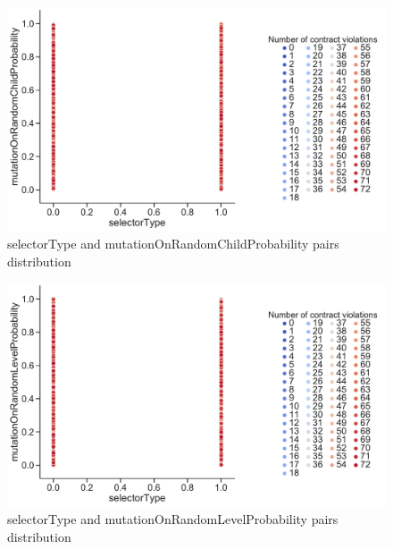 \begin{figure}
	\centering
	\includegraphics[width=\textwidth]{images/PairsDistr/selectorType_mutationOnRandomChildProbability.pdf}
	\caption[selectorType and mutationOnRandomChildProbability pairs distribution]{selectorType and mutationOnRandomChildProbability pairs distribution}
	\label{fig:selectorType_mutationOnRandomChildProbability_pair}
\end{figure}
\clearpage
\begin{figure}
	\centering
	\includegraphics[width=\textwidth]{images/PairsDistr/selectorType_mutationOnRandomLevelProbability.pdf}
	\caption[selectorType and mutationOnRandomLevelProbability pairs distribution]{selectorType and mutationOnRandomLevelProbability pairs distribution}
	\label{fig:selectorType_mutationOnRandomLevelProbability_pair}
\end{figure}
\clearpage
